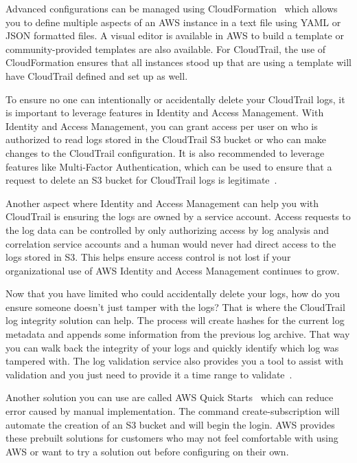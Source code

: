 Advanced configurations can be managed using 
CloudFormation~\cite{hid-sp18-518-CloudTrail-CloudFormation} which allows you
to define multiple aspects of an AWS instance in a text file using YAML or 
JSON formatted files. A visual editor is available in AWS to build a template
or community-provided templates are also available. For CloudTrail, the use
of CloudFormation ensures that all instances stood up that are using a template
will have CloudTrail defined and set up as well.

To ensure no one can intentionally or accidentally delete your CloudTrail logs,
it is important to leverage features in Identity and Access Management. With 
Identity and Access Management, you can grant access per user on who is 
authorized to read logs stored in the CloudTrail S3 bucket 
or who can make changes to the CloudTrail configuration. It is also recommended 
to leverage features like Multi-Factor Authentication, which can be used to 
ensure that a request to delete an S3 bucket for CloudTrail logs is 
legitimate~\cite{hid-sp18-518-CloudTrail-user-guide}. 

Another aspect where Identity and Access Management can help you with CloudTrail 
is ensuring the logs are owned by a service account. Access requests to the log 
data can be controlled by only authorizing access by log analysis and correlation 
service accounts and a human would never had direct access to the logs stored in 
S3. This helps ensure access control is not lost if your organizational use of 
AWS Identity and Access Management continues to grow. 

Now that you have limited who could accidentally delete your logs, how do you 
ensure someone doesn’t just tamper with the logs? That is where the CloudTrail 
log integrity solution can help. The process will create hashes for the current 
log metadata and appends some information from the previous log archive. That 
way you can walk back the integrity of your logs and quickly identify which log
 was tampered with. The log validation service also provides you a tool to 
assist with validation and you just need to provide it a time range to 
validate~\cite{hid-sp18-518-CloudTrail-user-guide}.

Another solution you can use are called AWS Quick 
Starts~\cite{hid-sp18-518-CloudTrail-Quick-Starts} which can reduce error 
caused by manual implementation. The command create-subscription will automate the 
creation of an S3 bucket and will begin the login. AWS provides these prebuilt
solutions for customers who may not feel comfortable with using AWS or want
to try a solution out before configuring on their own.

